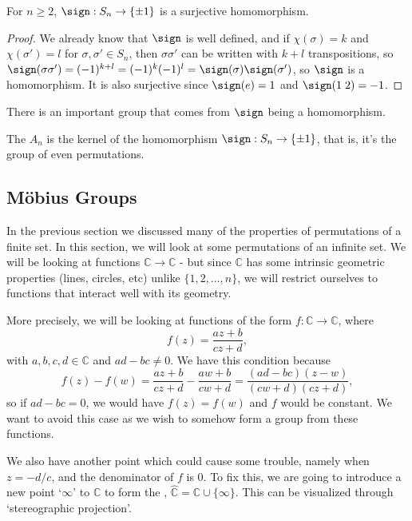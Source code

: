 \documentclass[a4paper]{scrartcl}
\begin{document}
\begin{proposition}
	For $n \geq 2$, $\sign : S_n \rightarrow \{\pm 1\}$ is a surjective homomorphism.
\end{proposition}
\begin{proof}
	We already know that $\sign$ is well defined, and if $\chi(\sigma) = k$ and $\chi(\sigma') = l$ for $\sigma, \sigma' \in S_n$, then $\sigma \sigma'$ can be written with $k + l$ transpositions, so $\sign(\sigma \sigma') = (-1)^{k + l} = (-1)^k (-1)^l = \sign(\sigma) \sign(\sigma')$, so $\sign$ is a homomorphism. It is also surjective since $\sign(e) = 1$ and $\sign(1\; 2) = -1$.
\end{proof}

There is an important group that comes from $\sign$ being a homomorphism.

\begin{definition}
	The  $A_n$ is the kernel of the homomorphism $\sign : S_n \rightarrow \{ \pm 1\}$, that is, it's the group of even permutations.
\end{definition}


\subsection{Möbius Groups}

In the previous section we discussed many of the properties of permutations of a finite set. In this section, we will look at some permutations of an infinite set. We will be looking at functions $\mathbb{C} \rightarrow \mathbb{C}$ - but since $\mathbb{C}$ has some intrinsic geometric properties (lines, circles, etc) unlike $\{1, 2, \dots, n\}$, we will restrict ourselves to functions that interact well with its geometry.

More precisely, we will be looking at functions of the form $f: \mathbb{C} \rightarrow \mathbb{C}$, where
$$
f(z) = \frac{az + b}{cz + d},
$$
with $a, b, c, d \in \mathbb{C}$ and $ad - bc \neq 0$. We have this condition because 
$$
f(z) - f(w) = \frac{az + b}{cz + d} - \frac{aw + b}{cw + d} = \frac{(ad - bc)(z - w)}{(cw + d)(cz + d)},
$$
so if $ad - bc = 0$, we would have $f(z) = f(w)$ and $f$ would be constant. We want to avoid this case as we wish to somehow form a group from these functions. 

We also have another point which could cause some trouble, namely when $z = -d/c$, and the denominator of $f$ is 0. To fix this, we are going to introduce a new point `$\infty$' to $\mathbb{C}$ to form the , $\hat{\mathbb{C}} = \mathbb{C} \cup \{ \infty \}$.  This can be visualized through `stereographic projection'.
\end{document}
